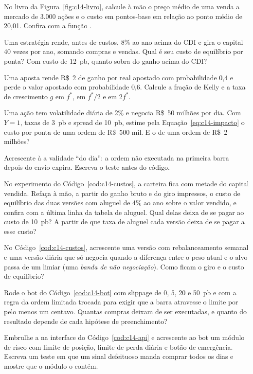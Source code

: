 \begin{exercicios}
  \item {} No livro da Figura~\ref{fig:c14-livro}, calcule à mão o preço médio de uma venda a mercado de 3.000 ações e o custo em pontos-base em relação ao ponto médio de 20,01. Confira com a função .
  \item {} Uma estratégia rende, antes de custos, 8\% ao ano acima do CDI e gira o capital 40 vezes por ano, somando compras e vendas. Qual é seu custo de equilíbrio por ponta? Com custo de 12~pb, quanto sobra do ganho acima do CDI?
  \item {} Uma aposta rende R\$~2 de ganho por real apostado com probabilidade 0,4 e perde o valor apostado com probabilidade 0,6. Calcule a fração de Kelly e a taxa de crescimento $g$ em $f^{*}$, em $f^{*}/2$ e em $2 f^{*}$.
  \item {} Uma ação tem volatilidade diária de 2\% e negocia R\$~50 milhões por dia. Com $Y = 1$, taxas de 3~pb e spread de 10~pb, estime pela Equação~\eqref{eq:c14-impacto} o custo por ponta de uma ordem de R\$~500 mil. E o de uma ordem de R\$~2 milhões?
  \item {} Acrescente à  a validade ``do dia'': a ordem não executada na primeira barra depois do envio expira. Escreva o teste antes do código.
  \item {} No experimento do Código~\ref{cod:c14-custos}, a carteira fica com metade do capital vendida. Refaça à mão, a partir do ganho bruto e do giro impressos, o custo de equilíbrio das duas versões com aluguel de 4\% ao ano sobre o valor vendido, e confira com a última linha da tabela de aluguel. Qual delas deixa de se pagar ao custo de 10~pb? A partir de que taxa de aluguel cada versão deixa de se pagar a esse custo?
  \item {} No Código~\ref{cod:c14-custos}, acrescente uma versão com rebalanceamento semanal e uma versão diária que só negocia quando a diferença entre o peso atual e o alvo passa de um limiar (uma \emph{banda de não negociação}). Como ficam o giro e o custo de equilíbrio?
  \item {} Rode o bot do Código~\ref{cod:c14-bot} com slippage de 0, 5, 20 e 50~pb e com a regra da ordem limitada trocada para exigir que a barra atravesse o limite por pelo menos um centavo. Quantas compras deixam de ser executadas, e quanto do resultado depende de cada hipótese de preenchimento?
  \item {} Embrulhe a  na interface  do Código~\ref{cod:c14-api} e acrescente ao bot um módulo de risco com limite de posição, limite de perda diária e botão de emergência. Escreva um teste em que um sinal defeituoso manda comprar todos os dias e mostre que o módulo o contém.
\end{exercicios}

